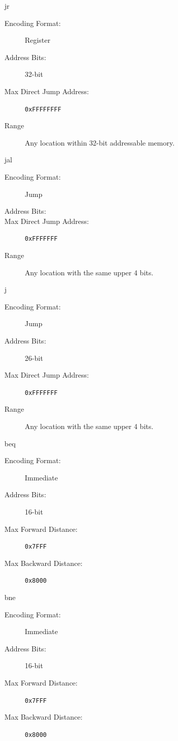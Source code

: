 \documentclass[12pt,letterpaper,titlepage]{article}
\begin{document}
\begin{raggedright}
\begin{enumerate}
\item[jr]
\begin{description}
\item[Encoding Format: ] Register
\item[Address Bits: ] 32-bit
\item[Max Direct Jump Address: ] \texttt{0xFFFFFFFF}
\item[Range] Any location within 32-bit addressable memory.
\end{description}
\item[jal]
\begin{description}
\item[Encoding Format: ] Jump
\item[Address Bits: ]
\item[Max Direct Jump Address: ] \texttt{0xFFFFFFF}
\item[Range] Any location with the same upper 4 bits.
\end{description}
\item[j]
\begin{description}
\item[Encoding Format: ] Jump
\item[Address Bits: ] 26-bit
\item[Max Direct Jump Address: ] \texttt{0xFFFFFFF}
\item[Range] Any location with the same upper 4 bits.
\end{description}
\item[beq]
\begin{description}
\item[Encoding Format: ] Immediate
\item[Address Bits: ] 16-bit
\item[Max Forward Distance: ] \texttt{0x7FFF}
\item[Max Backward Distance: ] \texttt{0x8000}
\end{description}
\item[bne]
\begin{description}
\item[Encoding Format: ] Immediate
\item[Address Bits: ] 16-bit
\item[Max Forward Distance: ] \texttt{0x7FFF}
\item[Max Backward Distance: ] \texttt{0x8000}
\end{description}
\end{enumerate}


\end{raggedright}
\end{document}
